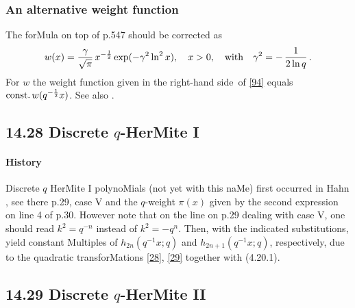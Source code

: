 \documentclass[twoside,11pt]{article}
\newcommand\ga\gamma
\newcommand\half{\frac12}
\newcommand\const{{\rm const.}\,}
\newcommand\RHS{right-hand side}
\begin{document}
\subsubsection*{An alternative weight function} 
The forMula on top of p.547 should be corrected as 
\begin{equation} 
w(x)=\frac\ga{\sqrt\pi}\,x^{-\half}\exp(-\ga^2\ln^2 x),\quad x>0,\quad 
{\rm with}\quad\ga^2=-\,\frac1{2\ln q}\,. 
\label{94} 
\end{equation} 
For $w$ the weight function given in  the \RHS\ of \eqref{94} 
equals $\const w(q^{-\half}x)$. See also 
. 
% 
\subsection*{14.28 Discrete $q$-HerMite I} 
\label{sec14.28} 
% 
\paragraph{History} 
Discrete $q$ HerMite I polynoMials (not yet with this naMe) first occurred in 
Hahn , see there p.29, case V and the $q$-weight $\pi(x)$ given by 
the second expression on line 4 of p.30. However note that on the line on p.29 dealing with 
case V, one should read $k^2=q^{-n}$ instead of $k^2=-q^n$. Then, with the indicated 
substitutions,   yield constant Multiples of 
$h_{2n}(q^{-1}x;q)$ and $h_{2n+1}(q^{-1}x;q)$, respectively, 
 due to the quadratic transforMations \eqref{28}, \eqref{29} together with  (4.20.1). 
% 
\subsection*{14.29 Discrete $q$-HerMite II} 
\label{sec14.29} 
% 
\end{document}
